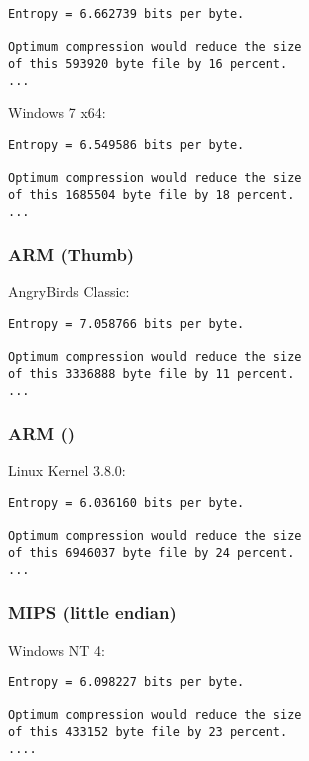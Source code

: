 \begin{lstlisting}
Entropy = 6.662739 bits per byte.

Optimum compression would reduce the size
of this 593920 byte file by 16 percent.
...
\end{lstlisting}

   Windows 7 x64:

\begin{lstlisting}
Entropy = 6.549586 bits per byte.

Optimum compression would reduce the size
of this 1685504 byte file by 18 percent.
...
\end{lstlisting}

\subsubsection{ARM (Thumb)}

AngryBirds Classic:

\begin{lstlisting}
Entropy = 7.058766 bits per byte.

Optimum compression would reduce the size
of this 3336888 byte file by 11 percent.
...
\end{lstlisting}

\subsubsection{ARM ()}

Linux Kernel 3.8.0:

\begin{lstlisting}
Entropy = 6.036160 bits per byte.

Optimum compression would reduce the size
of this 6946037 byte file by 24 percent.
...
\end{lstlisting}

\subsubsection{MIPS (little endian)}

   Windows NT 4:

\begin{lstlisting}
Entropy = 6.098227 bits per byte.

Optimum compression would reduce the size
of this 433152 byte file by 23 percent.
....
\end{lstlisting}

